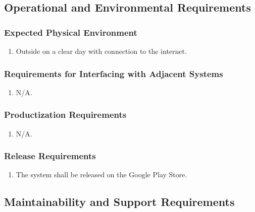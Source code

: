 \documentclass[]{article}
\begin{document}
\begin{enumerate}[{VP}1.]

\subsection{Operational and Environmental Requirements}
\label{sub:operational_and_environmental_requirements}

\subsubsection{Expected Physical Environment}
\label{ssub:expected_physical_environment}
\begin{enumerate}[{OE}1. ]
	\item Outside on a clear day with connection to the internet.
\end{enumerate}

\subsubsection{Requirements for Interfacing with Adjacent Systems}
\label{ssub:requirements_for_interfacing_with_adjacent_systems}
\begin{enumerate}[{OE}1. ]
	\item N/A.
\end{enumerate}

\subsubsection{Productization Requirements}
\label{ssub:productization_requirements}
\begin{enumerate}[{OE}1. ]
	\item N/A.
\end{enumerate}

\subsubsection{Release Requirements}
\label{ssub:release_requirements}
\begin{enumerate}[{OE}1. ]
	\item The system shall be released on the Google Play Store.
\end{enumerate}


\subsection{Maintainability and Support Requirements}
\label{sub:maintainability_and_support_requirements}


\end{enumerate}
\end{document}
